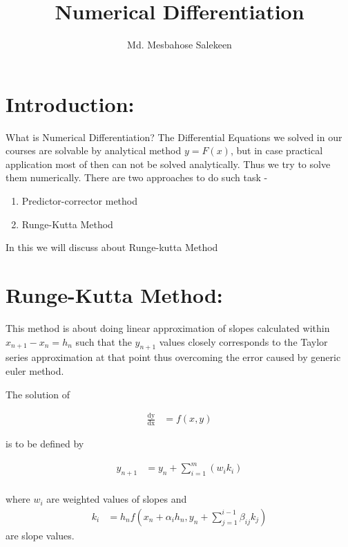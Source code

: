 \documentclass[12 pt]{article}
\title{Numerical Differentiation}
\author{Md. Mesbahose Salekeen}
\date{}
\begin{document}
\maketitle

\large
\section*{Introduction:}

What is Numerical Differentiation? The Differential Equations we solved in our courses are solvable by analytical method $y=F(x)$, but in case practical application most of then can not be solved analytically. Thus we try to solve them numerically. There are two approaches to do such task -
\begin{enumerate}
\item Predictor-corrector method
\item Runge-Kutta Method
\end{enumerate}

In this we will discuss about Runge-kutta Method

\section*{Runge-Kutta Method:}

This method is about doing linear approximation of slopes calculated within $x_{n+1} - x_{n} = h_{n}$ such that the $y_{n+1}$ values closely corresponds to the Taylor series approximation at that point thus overcoming the error caused by generic euler method. 

The solution of 

{
\Large
\begin{equation}\label{E3}
\begin{split}
\frac{\mathop{\mathrm{d}y}}{\mathop{\mathrm{d}x}} &= f(x,y)
\end{split}
\end{equation}
}

is to be defined by

{
\Large
\begin{equation}\label{E1}
\begin{split}
y_{n+1} & = y_{n} + \sum_{i=1}^{m}(w_{i}k_{i}) \\
\end{split}
\end{equation}
}

where $w_{i}$ are weighted values of slopes and 
{
\Large
\begin{equation}\label{E2}
\begin{split}
k_{i} &= h_{n}f(x_{n}+\alpha_{i}h_{n}, y_{n}+\sum_{j=1}^{i-1}\beta_{ij}k_{j})
\end{split}
\end{equation}
}
are slope values.
\end{document}
